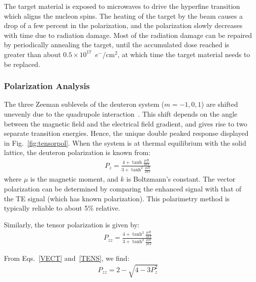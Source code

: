 The target material is exposed to microwaves
to drive the hyperfine transition which  aligns the nucleon spins. 
 The heating of the target by the beam causes a drop of a few percent in
the polarization, and the polarization slowly decreases with time due to radiation
damage. Most of the radiation damage can be repaired by periodically annealing the target,
until the accumulated dose reached is greater than about 
 $0.5\times 10^{17}$~$e^-$/cm$^2$,
at
which time the target material needs to be replaced. 

\subsubsection{Polarization Analysis} 
The three Zeeman sublevels of the deuteron system ($m=-1,0,1$) are
shifted unevenly due to the quadrupole interaction~\cite{Meyer:1985dta}. This shift
depends on the angle between the magnetic field and the electrical field gradient, and gives rise to two separate transition
energies. Hence, the unique double peaked response displayed in Fig.~\ref{fig:tensorpol}.
When the system is at thermal equilibrium with the solid lattice, the deuteron polarization is known from:
\begin{eqnarray}
\label{VECT}
P_z = \frac{4+\tanh\frac{\mu B}{2 k T}} {3+\tanh^2\frac{\mu B}{2 k T}    }
\end{eqnarray}
where $\mu$ is the magnetic moment, and $k$ is Boltzmann's constant.  The vector polarization can be determined by comparing
the enhanced signal with that of the TE signal (which has known polarization).  This polarimetry method is typically reliable to about 5\% relative.

Similarly, the tensor polarization is given by: 
\begin{eqnarray}
\label{TENS}
P_{zz} = \frac{4+\tanh^2\frac{\mu B}{2 k T}} {3+\tanh^2\frac{\mu B}{2 k T}    }
\end{eqnarray}

From Eqs.~\ref{VECT} and~\ref{TENS}, we find:
\begin{eqnarray*}
\label{PZZEQN}
P_{zz}= 2 - \sqrt{4-3 P_z^2}
\end{eqnarray*}


